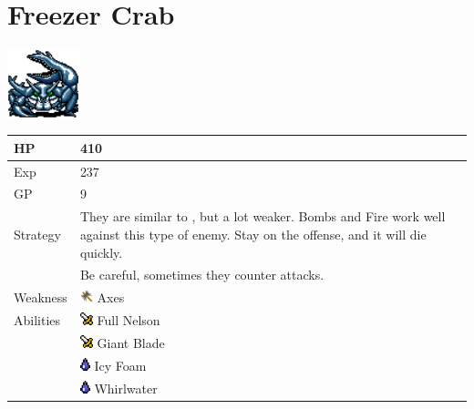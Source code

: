\section{Freezer Crab}
\label{monster:freezer_crab}

\includegraphics[height=2cm,keepaspectratio]{./resources/monster/freezer_crab}

\begin{longtable}{ l p{9cm} }
	HP
	& 410
\\ \hline
	Exp
	& 237
\\ \hline
	GP
	& 9
\\ \hline
	Strategy
	& They are similar to \nameref{monster:snow_crab}, but a lot weaker. Bombs and Fire work well against this type of enemy. Stay on the offense, and it will die quickly. \\
	& Be careful, sometimes they counter attacks.
\\ \hline
	Weakness
	& \includegraphics[height=1em,keepaspectratio]{./resources/effects/axe} Axes
\\ \hline
	Abilities
	& \includegraphics[height=1em,keepaspectratio]{./resources/effects/damage} Full Nelson \\
	& \includegraphics[height=1em,keepaspectratio]{./resources/effects/damage} Giant Blade \\
	& \includegraphics[height=1em,keepaspectratio]{./resources/effects/water} Icy Foam \\
	& \includegraphics[height=1em,keepaspectratio]{./resources/effects/water} Whirlwater
\end{longtable}
